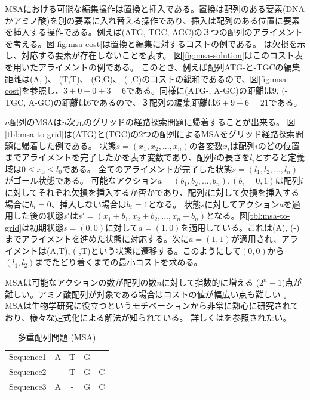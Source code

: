 MSAにおける可能な編集操作は置換と挿入である。置換は配列のある要素(DNAかアミノ酸)を別の要素に入れ替える操作であり、挿入は配列のある位置に要素を挿入する操作である。例えば(ATG, TGC, AGC)の３つの配列のアライメントを考える。図\ref{fig:msa-cost}は置換と編集に対するコストの例である。-は欠損を示し、対応する要素が存在しないことを表す。%
図\ref{fig:msa-solution}はこのコスト表を用いたアライメントの例である。
このとき、例えば配列ATG-と-TGCの編集距離は(A,-)、 (T,T)、 (G,G)、 (-,C)のコストの総和であるので、図\ref{fig:msa-cost}を参照し、$3+0+0+3=6$である。同様に(ATG-, A-GC)の距離は$9$, (-TGC, A-GC)の距離は$6$であるので、３配列の編集距離は$6+9+6=21$である。

$n$配列のMSAは$n$次元のグリッドの経路探索問題に帰着することが出来る\cite{korf:2000}。
図\ref{tbl:msa-to-grid}は(ATG)と(TGC)の2つの配列によるMSAをグリッド経路探索問題に帰着した例である。
状態$s = (x_1, x_2,...,x_n)$の各変数$x_i$は配列$i$のどの位置までアライメントを完了したかを表す変数であり、配列$i$の長さを$l_i$とすると定義域は$0 \leq x_0 \leq l_0$である。
全てのアライメントが完了した状態$s=(l_1, l_2,...,l_n)$がゴール状態である。
可能なアクション$a=(b_1, b_2, ..., b_n), (b_i=0, 1)$は配列$i$に対してそれぞれ欠損を挿入するか否かであり、配列$i$に対して欠損を挿入する場合に$b_i=0$、挿入しない場合は$b_i=1$となる。
状態$s$に対してアクション$a$を適用した後の状態$s'$は$s'=(x_1+b_1, x_2+b_2,..., x_n+b_n)$となる。図\ref{tbl:msa-to-grid}は初期状態$s=(0,0)$に対して$a=(1,0)$を適用している。これは(A), (-)までアライメントを進めた状態に対応する。次に$a=(1,1)$が適用され、アライメントは(A,T), (-,T)という状態に遷移する。このようにして$(0, 0)$から$(l_1, l_2)$までたどり着くまでの最小コストを求める。

MSAは可能なアクションの数が配列の数$n$に対して指数的に増える ($2^n-1$)点が難しい。アミノ酸配列が対象である場合はコストの値が幅広い点も難しい \cite{pearson1990}。
MSAは生物学研究に役立つというモチベーションから非常に熱心に研究されており、様々な定式化による解法が知られている。
詳しくは\cite{waterman1995introduction,
gusfield1997algorithms,edgar2006multiple}を参照されたい。

\begin{table}
  \centering
  \caption{多重配列問題 (MSA)}
\begin{tabular}{c|cccc}
	Sequence1 & A & T & G & - \\
	Sequence2 & - & T & G & C \\
	Sequence3 & A & - & G & C \\
\end{tabular}
\label{tbl:msa}
\end{table}

